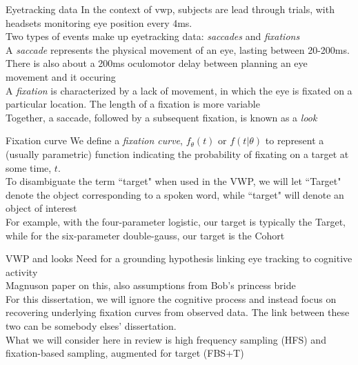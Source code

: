 \documentclass{beamer}
\begin{document}
\begin{frame}{Eyetracking data}
In the context of vwp, subjects are lead through trials, with headsets monitoring eye position every 4ms. \newline \\

Two types of events make up eyetracking data: \textit{saccades} and \textit{fixations} \newline \\

A \textit{saccade} represents the physical movement of an eye, lasting between 20-200ms. There is also about a 200ms oculomotor delay between planning an eye movement and it occuring \newline \\

A \textit{fixation} is characterized by a lack of movement, in which the eye is fixated on a particular location. The length of a fixation is more  variable \newline \\

Together, a saccade, followed by a subsequent fixation, is known as a \textit{look}
\end{frame}

\begin{frame}{Fixation curve}
We define a \textit{fixation curve}, $f_{\theta}(t)$ or $f(t  | \theta)$ to represent a (usually parametric) function indicating the probability of fixating on a target at some time, $t$. \newline \\
To disambiguate the term ``target" when used in the VWP, we will let ``Target" denote the object corresponding to a spoken word, while ``target" will denote an object of interest \newline \\

For example, with the four-parameter logistic, our target is typically the Target, while for the six-parameter double-gauss, our target is the Cohort
\end{frame}

\begin{frame}{VWP and looks}
Need for a grounding hypothesis linking eye tracking to cognitive activity \newline \\

Magnuson paper on this, also assumptions from Bob's princess bride \newline \\

For this dissertation, we will ignore the cognitive process and instead focus on recovering underlying fixation curves from observed data. The link between these two can be somebody elses' dissertation. \newline \\

What we will consider here in review is high frequency sampling (HFS) and fixation-based sampling, augmented for target (FBS+T)

\end{frame}
\end{document}
